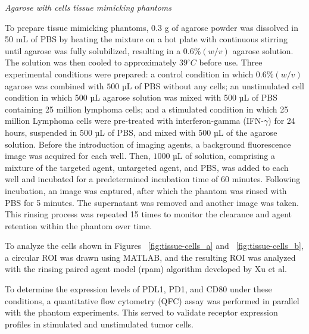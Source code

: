 \textit{Agarose with cells tissue mimicking phantoms}

To prepare tissue mimicking phantoms, $0.3$ g of agarose powder was dissolved in 50 mL of PBS by heating the mixture on a hot plate with continuous stirring until agarose was fully solubilized, resulting in a $0.6\% (w/v)$ agarose solution. The solution was then cooled to approximately $39^\circ C$ before use. Three experimental conditions were prepared: a control condition in which $0.6\% (w/v)$ agarose was combined with $500$ µL of PBS without any cells; an unstimulated cell condition in which 500 µL agarose solution was mixed with 500 µL of PBS containing 25 million lymphoma cells; and a stimulated condition in which 25 million  Lymphoma cells were pre-treated with interferon-gamma (IFN-$\gamma$) for 24 hours, suspended in $500$ µL of PBS, and mixed with 500 µL of the agarose solution. Before the introduction of imaging agents, a background fluorescence image was acquired for each well. Then, $1000$ µL of solution, comprising a mixture of the targeted agent, untargeted agent, and PBS, was added to each well and incubated for a predetermined incubation time of $60$ minutes. Following incubation, an image was captured, after which the phantom was rinsed with PBS for 5 minutes. The supernatant was removed and another image was taken. This rinsing process was repeated 15 times to monitor the clearance and agent retention within the phantom over time. 

To analyze the cells shown in Figures ~\ref{fig:tissue-cells_a} and ~\ref{fig:tissue-cells_b}, a circular ROI was drawn using MATLAB, and the resulting ROI was analyzed with the rinsing paired agent model (rpam) algorithm developed by Xu et al. \cite{xu2017rpam}

To determine the expression levels of PDL1, PD1, and CD80 under these conditions, a quantitative flow cytometry (QFC) assay was performed in parallel with the phantom experiments. This served to validate receptor expression profiles in stimulated and unstimulated tumor cells.

